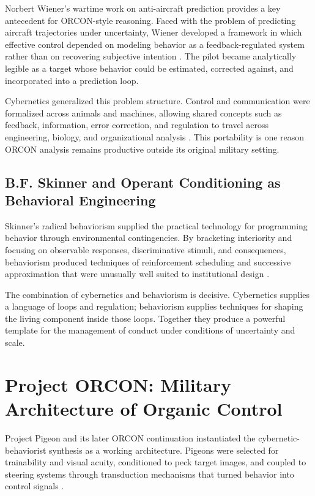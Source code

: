 \documentclass[11pt, a4paper]{article}
\begin{document}
Norbert Wiener's wartime work on anti-aircraft prediction provides a key antecedent for ORCON-style reasoning. Faced with the problem of predicting aircraft trajectories under uncertainty, Wiener developed a framework in which effective control depended on modeling behavior as a feedback-regulated system rather than on recovering subjective intention \cite{wiener1948cybernetics}. The pilot became analytically legible as a target whose behavior could be estimated, corrected against, and incorporated into a prediction loop.

Cybernetics generalized this problem structure. Control and communication were formalized across animals and machines, allowing shared concepts such as feedback, information, error correction, and regulation to travel across engineering, biology, and organizational analysis \cite{wiener1948cybernetics}. This portability is one reason ORCON analysis remains productive outside its original military setting.

\subsection{B.F. Skinner and Operant Conditioning as Behavioral Engineering}

Skinner's radical behaviorism supplied the practical technology for programming behavior through environmental contingencies. By bracketing interiority and focusing on observable responses, discriminative stimuli, and consequences, behaviorism produced techniques of reinforcement scheduling and successive approximation that were unusually well suited to institutional design \cite{skinner1938,skinner1953science}.

The combination of cybernetics and behaviorism is decisive. Cybernetics supplies a language of loops and regulation; behaviorism supplies techniques for shaping the living component inside those loops. Together they produce a powerful template for the management of conduct under conditions of uncertainty and scale.

\section{Project ORCON: Military Architecture of Organic Control}

Project Pigeon and its later ORCON continuation instantiated the cybernetic-behaviorist synthesis as a working architecture. Pigeons were selected for trainability and visual acuity, conditioned to peck target images, and coupled to steering systems through transduction mechanisms that turned behavior into control signals \cite{skinner1960pigeons,capshew1993engineering}.
\end{document}
